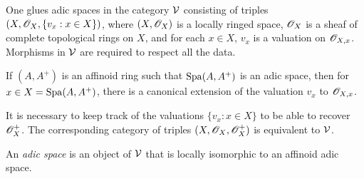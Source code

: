One glues adic spaces in the category $\mathcal{V}$ consisting of triples 
$(X,\mathscr{O}_X,\{v_x:x\in X\})$, where $(X,\mathscr{O}_X)$ is a locally ringed space, 
$\mathscr{O}_X$ is a sheaf of complete topological rings on $X$, and for each 
$x\in X$, $v_x$ is a valuation on $\mathscr{O}_{X,x}$. Morphisms in $\mathcal{V}$ are required 
to respect all the data. 

If $(A,A^+)$ is an affinoid ring such that $\operatorname{Spa}(A,A^+)$ is an adic space, 
then for $x\in X=\operatorname{Spa}(A,A^+)$, there is a canonical extension of the valuation 
$v_x$ to $\mathscr{O}_{X,x}$. 

It is necessary to keep track of the valuations $\{v_x:x\in X\}$ to be able to 
recover $\mathscr{O}_X^+$. The corresponding category of triples $(X,\mathscr{O}_X,\mathscr{O}_X^+)$ 
is equivalent to $\mathcal{V}$. 

\begin{definition}
An \emph{adic space} is an object of $\mathcal{V}$ that is locally isomorphic to an 
affinoid adic space. 
\end{definition}
